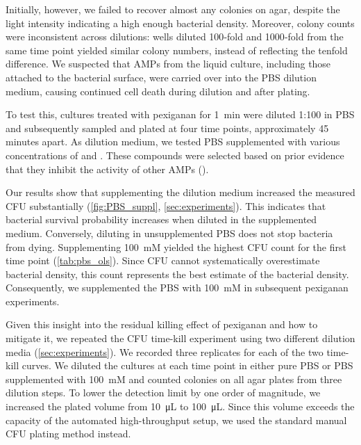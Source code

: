 Initially, however, we failed to recover almost any colonies on agar, despite the light intensity indicating a high enough bacterial density.
Moreover, colony counts were inconsistent across dilutions: wells diluted 100‐fold and 1000‐fold from the same time point yielded similar colony numbers, instead of reflecting the tenfold difference.
We suspected that AMPs from the liquid culture, including those attached to the bacterial surface, were carried over into the PBS dilution medium, causing continued cell death during dilution and after plating.

To test this, cultures treated with pexiganan for \SI{1}{\minute} were diluted 1:100 in PBS and subsequently sampled and plated at four time points, approximately 45 minutes apart.
As dilution medium, we tested PBS supplemented with various concentrations of  and .
These compounds were selected based on prior evidence that they inhibit the activity of other AMPs (\cite{Deslouches2005}).

Our results show that supplementing the dilution medium increased the measured CFU substantially (\autoref{fig:PBS_suppl}, \autoref{sec:experiments}).
This indicates that bacterial survival probability increases when diluted in the supplemented medium.
Conversely, diluting in unsupplemented PBS does not stop bacteria from dying.
Supplementing \SI{100}{\milli M}  yielded the highest CFU count for the first time point (\autoref{tab:pbs_ols}).
Since CFU cannot systematically overestimate bacterial density, this count represents the best estimate of the bacterial density.
Consequently, we supplemented the PBS with \SI{100}{\milli M}  in subsequent pexiganan experiments.

Given this insight into the residual killing effect of pexiganan and how to mitigate it, we repeated the CFU time-kill experiment using two different dilution media (\autoref{sec:experiments}).
We recorded three replicates for each of the two time-kill curves.
We diluted the cultures at each time point in either pure PBS or PBS supplemented with \SI{100}{\milli M}  and counted colonies on all agar plates from three dilution steps.
To lower the detection limit by one order of magnitude, we increased the plated volume from \SI{10}{\micro\liter} to \SI{100}{\micro\liter}.
Since this volume exceeds the capacity of the automated high-throughput setup, we used the standard manual CFU plating method instead.

